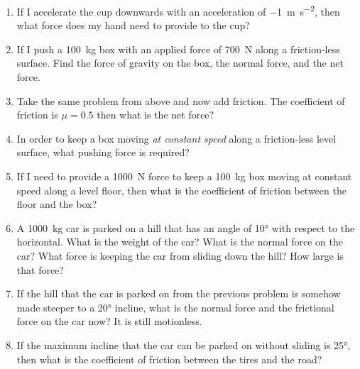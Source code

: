 \begin{enumerate}
\item If I accelerate the cup downwards with an acceleration of \SI{-1}{\meter \per \second^2}, then what force does my hand need to provide to the cup?\bigskip


\item If I push a \SI{100}{\kilogram} box with an applied force of \SI{700}{\newton} along a friction-less surface. Find the force of gravity on the box, the normal force, and the net force.\hugeskip

\item Take the same problem from above and now add friction. The coefficient of friction is $\mu=0.5$ then what is the net force?\hugeskip

\item In order to keep a box moving \emph{at constant speed} along a friction-less level surface, what pushing force is required?

\item If I need to provide a \SI{1000}{\newton} force to keep a \SI{100}{\kilogram} box moving at constant speed along a level floor, then what is the coefficient of friction between the floor and the box?\giantskip

\item A \SI{1000}{\kilogram} car is parked on a hill that has an angle of \ang{10} with respect to the horizontal. What is the weight of the car? What is the normal force on the car? What force is keeping the car from sliding down the hill? How large is that force?\giantskip

\item If the hill that the car is parked on from the previous problem is somehow made steeper to a \ang{20} incline, what is the normal force and the frictional force on the car now? It is still motionless.\giantskip

\item If the maximum incline that the car can be parked on without sliding is \ang{25}, then what is the coefficient of friction between the tires and the road?\giantskip






\end{enumerate}
